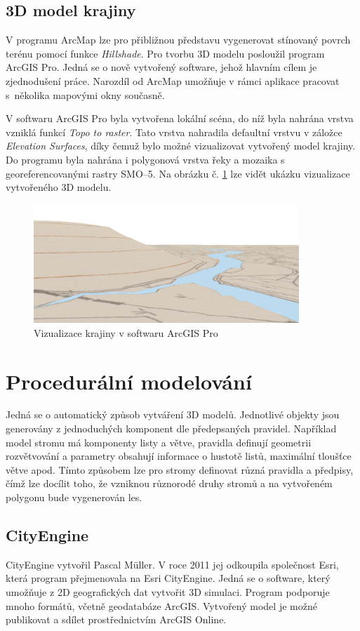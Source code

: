 \documentclass[thesis=M,czech]{FITthesis}[2012/06/26]
\begin{document}
\subsection{3D model krajiny}
V programu ArcMap lze pro přibližnou představu vygenerovat stínovaný povrch terénu pomocí funkce \textit{Hillshade}. Pro tvorbu 3D modelu posloužil program ArcGIS Pro. Jedná se o nově vytvořený software, jehož hlavním cílem je zjednodušení práce. Narozdíl od ArcMap umožňuje v rámci aplikace pracovat s~několika mapovými okny současně. 

V softwaru ArcGIS Pro byla vytvořena lokální scéna, do níž byla nahrána vrstva vzniklá funkcí \textit{Topo to raster}. Tato vrstva nahradila defaultní vrstvu v záložce \textit{Elevation Surfaces}, díky čemuž bylo možné vizualizovat vytvořený model krajiny. Do programu byla nahrána i polygonová vrstva řeky a mozaika s georeferencovanými rastry SMO–5. Na obrázku č. \ref{obrazek:otava_knezihora} lze vidět ukázku vizualizace vytvořeného 3D modelu.

\begin{figure}[h]
	\centering
	\includegraphics[width=10cm]{pics/arcgispro.png}
	\caption{Vizualizace krajiny v softwaru ArcGIS Pro}
	\label{obrazek:otava_knezihora}
\end{figure}

\section{Procedurální modelování}
Jedná se o automatický způsob vytváření 3D modelů. Jednotlivé objekty jsou generovány z jednoduchých komponent dle předepsaných pravidel. Například model stromu má komponenty listy a větve, pravidla definují geometrii rozvětvování a parametry obsahují informace o hustotě listů, maximální tloušťce větve apod. Tímto způsobem lze pro stromy definovat různá pravidla a předpisy, čímž lze docílit toho, že vzniknou různorodé druhy stromů a na vytvořeném polygonu bude vygenerován les. \cite{jaderka}

\subsection{CityEngine}
CityEngine vytvořil Pascal Müller. V roce 2011 jej odkoupila společnost Esri, která program přejmenovala na Esri CityEngine. Jedná se o software, který umožňuje z 2D geografických dat vytvořit 3D simulaci. Program podporuje mnoho formátů, včetně geodatabáze ArcGIS. Vytvořený model je možné publikovat a sdílet prostřednictvím ArcGIS Online. \cite{arcdata}
\end{document}
